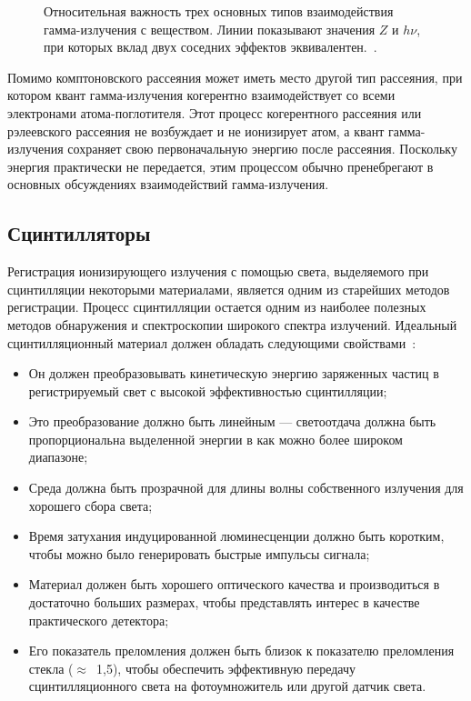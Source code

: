 \begin{figure}[ht]
  \caption{ Относительная важность трех основных типов взаимодействия гамма-излучения с веществом. Линии показывают значения $Z$ и $h \nu$, при которых вклад двух соседних эффектов эквивалентен.~\cite{Evans1955}.}
  \label{fig:gammaProcessesImpotance}
\end{figure}

Помимо комптоновского рассеяния может иметь место другой тип рассеяния, при котором квант гамма-излучения когерентно взаимодействует со всеми электронами атома-поглотителя. Этот процесс когерентного рассеяния или рэлеевского рассеяния не возбуждает и не ионизирует атом, а квант гамма-излучения сохраняет свою первоначальную энергию после рассеяния. Поскольку энергия практически не передается, этим процессом обычно пренебрегают в основных обсуждениях взаимодействий гамма-излучения.~\cite{Knoll2010}


\subsection{ Сцинтилляторы }

Регистрация ионизирующего излучения с помощью света, выделяемого при сцинтилляции некоторыми материалами, является одним из старейших методов регистрации. Процесс сцинтилляции остается одним из наиболее полезных методов обнаружения и спектроскопии широкого спектра излучений. Идеальный сцинтилляционный материал должен обладать следующими свойствами~\cite{Knoll2010}:
\begin{itemize}
  \item Он должен преобразовывать кинетическую энергию заряженных частиц в регистрируемый свет с высокой эффективностью сцинтилляции;
  \item Это преобразование должно быть линейным --- светоотдача должна быть пропорциональна выделенной энергии в как можно более широком диапазоне;
  \item Среда должна быть прозрачной для длины волны собственного излучения для хорошего сбора света;
  \item Время затухания индуцированной люминесценции должно быть коротким, чтобы можно было генерировать быстрые импульсы сигнала;
  \item Материал должен быть хорошего оптического качества и производиться в достаточно больших размерах, чтобы представлять интерес в качестве практического детектора;
  \item Его показатель преломления должен быть близок к показателю преломления стекла ($\approx$~1,5), чтобы обеспечить эффективную передачу сцинтилляционного света на фотоумножитель или другой датчик света.
\end{itemize}

